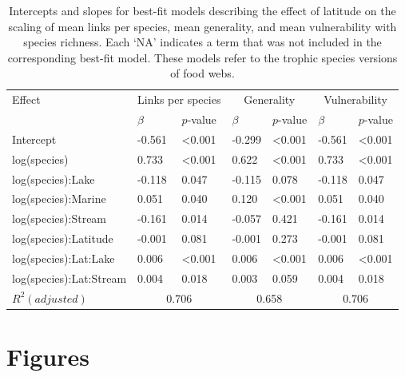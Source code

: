 \documentclass[12pt]{article}
\begin{document}
\begin{table}[!h]
\caption{Intercepts and slopes for best-fit models describing the effect of latitude on the scaling of mean links per species, mean generality, and mean vulnerability with species richness. Each `NA' indicates a term that was not included in the corresponding best-fit model. These models refer to the trophic species versions of food webs. }
\label{Bestfits}
\begin{tabular}{l | l l  l l  l l }
Effect          & \multicolumn{2}{c|}{Links per species} & \multicolumn{2}{c|}{Generality} 
                & \multicolumn{2}{c}{Vulnerability}\\
                & $\beta$ & $p$-value     &  $\beta$ & $p$-value    &  $\beta$ & $p$-value  \\
\hline
Intercept               & -0.561 & \textless0.001 & -0.299 & \textless0.001 & -0.561 & \textless0.001 \\
log(species)            &  0.733 & \textless0.001 &  0.622 & \textless0.001 &  0.733 & \textless0.001 \\
log(species):Lake       & -0.118 & 0.047          & -0.115 & 0.078          & -0.118 & 0.047 \\
log(species):Marine     &  0.051 & 0.040          &  0.120 & \textless0.001 &  0.051 & 0.040 \\
log(species):Stream     & -0.161 & 0.014          & -0.057 & 0.421          & -0.161 & 0.014 \\
log(species):Latitude   & -0.001 & 0.081          & -0.001 & 0.273          & -0.001 & 0.081 \\
log(species):Lat:Lake   &  0.006 & \textless0.001 &  0.006 & \textless0.001 &  0.006 & \textless0.001 \\
log(species):Lat:Stream &  0.004 & 0.018          &  0.003 & 0.059          &  0.004 & 0.018 \\
\hline
$R^{2} (adjusted)$   & \multicolumn{2}{c|}{0.706} & \multicolumn{2}{c|}{0.658} & \multicolumn{2}{c}{0.706} \\
\hline
\end{tabular}
\end{table}

\newpage

\section*{Figures}

\end{document}
